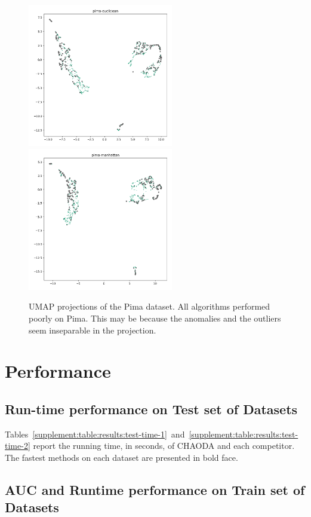 \begin{figure}
   \centering
   \includegraphics[width=2.5in]{images/umaps/pima-euclidean-umap2d.png}
   \includegraphics[width=2.5in]{images/umaps/pima-manhattan-umap2d.png}
   \caption{UMAP projections of the Pima dataset.
   All algorithms performed poorly on Pima.
   This may be because the anomalies and the outliers seem inseparable in the projection.}
   \label{supplement:fig:conclusions:umap-embeddings-2}
\end{figure}


\section{Performance}
\label{supplement:sec:performance}

\subsection{Run-time performance on Test set of Datasets}

Tables~\ref{supplement:table:results:test-time-1}~and~\ref{supplement:table:results:test-time-2} report the running time, in seconds, of CHAODA and each competitor.
The fastest methods on each dataset are presented in bold face.

\subsection{AUC and Runtime performance on Train set of Datasets}

